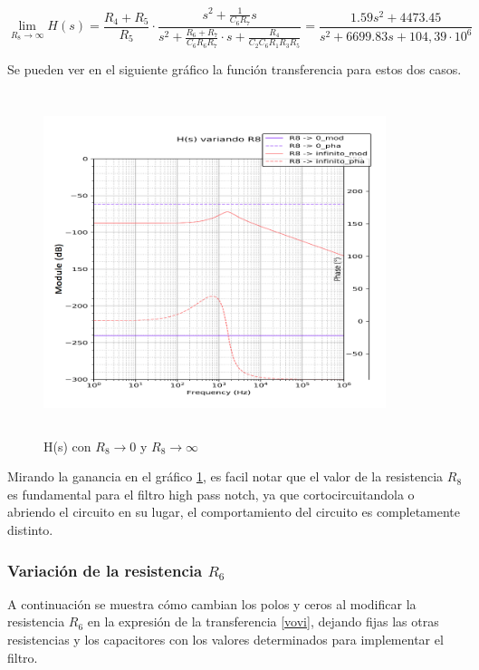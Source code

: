 \begin{equation}
\lim_{R_8\to \infty} H(s) = \frac{R_4 + R_5}{R_5} \cdot \frac{s^2 + \frac{1}{C_6 R_7}s}{s^2 + \frac{R_6 + R_7}{C_6 R_6 R_7}\cdot s + \frac{R_4}{C_2 C_6 R_1 R_3 R_5}} = \frac{1.59 s^{2} + 4473.45}{s^{2} + 6699.83 s + 104,39 \cdot 10^6}
\end{equation}

Se pueden ver en el siguiente gr\'afico la funci\'on transferencia para estos dos casos.

\begin{figure}[H] %
	\centering
	\includegraphics[width=10cm,height=10cm,keepaspectratio]{../EJ1/00GRAFICOS/r88.png}
	\caption{H(s) con $R_8 \to 0$ y $R_8 \to \infty$}
	\label{r8}
\end{figure}

Mirando la ganancia en el gr\'afico \ref{r8}, es facil notar que el valor de la resistencia $R_8$ es fundamental para el filtro high pass notch, ya que cortocircuitandola o abriendo el circuito en su lugar, el comportamiento del circuito es completamente distinto.

\subsubsection{Variaci\'on de la resistencia $R_6$}

A continuaci\'on se muestra c\'omo cambian los polos y ceros al modificar la resistencia $R_6$ en la expresi\'on de la transferencia \ref{vovi}, dejando fijas las otras resistencias y los capacitores con los valores determinados para implementar el filtro.


